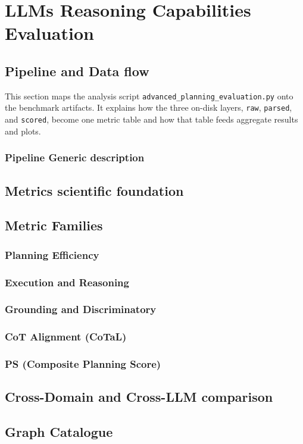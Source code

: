 \newpage
\section{LLMs Reasoning Capabilities Evaluation}
    \subsection{Pipeline and Data flow}
    This section maps the analysis script \texttt{advanced\_planning\_evaluation.py} onto the benchmark artifacts. It explains how the three on-disk layers, \texttt{raw}, \texttt{parsed}, and \texttt{scored}, become one metric table and how that table feeds aggregate results and plots.
    \subsubsection{Pipeline Generic description}
    
    \subsection{Metrics scientific foundation}
    
    \subsection{Metric Families}
        \subsubsection{Planning Efficiency}
        
        \subsubsection{Execution and Reasoning}
        
        \subsubsection{Grounding and Discriminatory}
        
        \subsubsection{CoT Alignment (CoTaL)}
        
        \subsubsection{PS (Composite Planning Score)}
        
    \subsection{Cross-Domain and Cross-LLM comparison}
    
    \clearpage
    \subsection{Graph Catalogue}
    